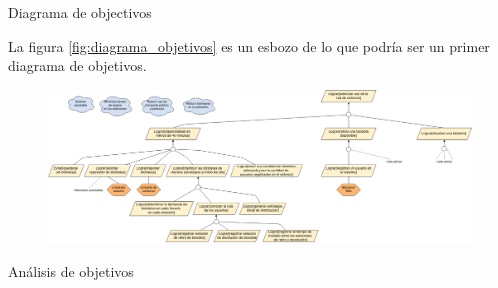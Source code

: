 \begin{subsection}{Diagrama de objectivos}

La figura \ref{fig:diagrama_objetivos} es un esbozo de lo que podría ser un primer diagrama de objetivos.

\begin{figure}[H]
        \centering
        \includegraphics[angle=90,scale=0.23]{imagenes/diagrama_de_objetivos.png}
\end{figure}
%	
%

\end{subsection}

\begin{subsection}{Análisis de objetivos}

\end{subsection}